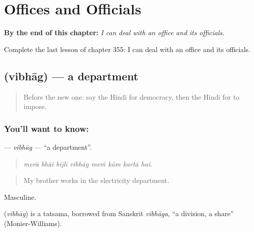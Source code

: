 
\chapter{Offices and Officials}
\label{ch:hi-offices-and-officials}

\begin{chapteropening}
\textbf{By the end of this chapter:} \emph{I can deal with an office and its officials.}

Complete the last lesson of chapter 355: I can deal with an office and its officials.
\end{chapteropening}

\section[\texorpdfstring{\hi{विभाग} (vibhāg)}{विभाग (vibhāg)}]{ (vibhāg) — a department}

\label{lesson:HI-C355-vibhag}



\begin{quote}
Before the new one: say the Hindi for democracy, then the Hindi for to impose.
\end{quote}

\subsection*{You'll want to know: }
\textbf{} — \emph{vibhāg} — \textquotedblleft{}a department\textquotedblright{}.

\begin{quote}
       
\end{quote}

\begin{quote}
\emph{merā bhāī bijlī vibhāg meṁ kām kartā hai.}
\end{quote}

\begin{quote}
My brother works in the electricity department.
\end{quote}

Masculine.

\begin{cousinweb}
\textbf{} (\emph{vibhāg}) is a tatsama, borrowed from Sanskrit \emph{vibhāga}, \textquotedblleft{}a division, a share\textquotedblright{} (Monier-Williams).
\end{cousinweb}

